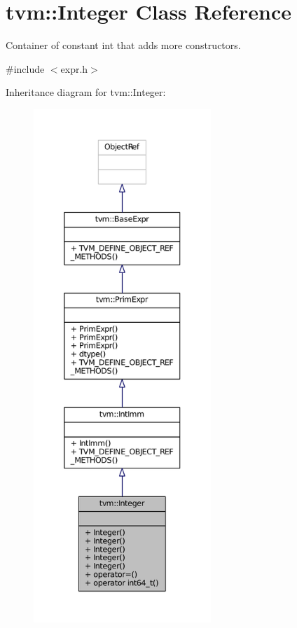 \hypertarget{classtvm_1_1Integer}{}\section{tvm\+:\+:Integer Class Reference}
\label{classtvm_1_1Integer}


Container of constant int that adds more constructors.  




{\ttfamily \#include $<$expr.\+h$>$}



Inheritance diagram for tvm\+:\+:Integer\+:
\nopagebreak
\begin{figure}[H]
\begin{center}
\leavevmode
\includegraphics[height=550pt]{classtvm_1_1Integer__inherit__graph}
\end{center}
\end{figure}


